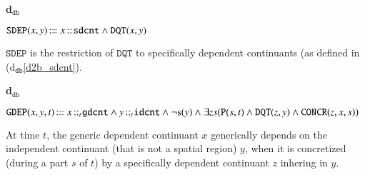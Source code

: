 \documentclass[ao]{iosart2x}
\newcommand{\bfoAxLabel}{\textrm{a$_\texttt{b}$}}
\newcommand{\dolceDefLabel}{\textrm{d$_\texttt{d}$}}
\newcommand{\dbDefLabel}{\textrm{d$_\texttt{db}$}}
\newcounter{cntdbdf}
\newcommand{\dbdf}[1]{\refstepcounter{cntdbdf}\begin{small}{\bf \dbDefLabel\thecntdbdf\label{#1}}\end{small}}
\newcommand{\refdolcedf}[1]{({\dolceDefLabel}\ref{#1})}
\newcommand{\refbfoax}[1]{({\bfoAxLabel}\ref{#1})}
\newcommand{\refdbdf}[1]{({\dbDefLabel}\ref{#1})}
\newcommand{\pr}[1]{\mathtt{#1}}
\newcommand{\cn}[1]{\mathtt{#1}}
\newcommand\textequal{%
 \rule[.08ex]{5pt}{0.35pt}\llap{\rule[.78ex]{5pt}{0.35pt}}}
\newcommand{\sdef}{{\hspace{1.5pt}:\hspace{-2.5pt}\textequal\hspace{3pt}}}
\newcommand{\dolce}{{\textsc{dolce}}}
\newcommand{\bfo}{{\textsc{bfo}}}
\newcommand {\Sdcat} {\textsc{s}}
\newcommand {\Pd} {\ensuremath{\pr{P}}}
\newcommand {\DQTd} {\ensuremath{\pr{DQT}}}
\newcommand {\SDd} {\ensuremath{\pr{SD}}}
\newcommand {\SLCd} {\ensuremath{\pr{SLC}}}
\newcommand{\idcntbcat}{\cn{idcnt}}
\newcommand{\gdcntbcat}{\cn{gdcnt}}
\newcommand{\sdcntbcat}{\cn{sdcnt}}
\newcommand{\bfocoverlap}{\pr{cO}}
\newcommand{\bfoiof}[1]{{\,::_{#1\:\!}}}
\newcommand{\bfosdep}{\pr{SDEP}}
\newcommand{\bfogdep}{\pr{GDEP}}
\newcommand{\bfolocated}{\pr{LOC}}
\newcommand{\bfoconcr}{\pr{CONCR}}
\begin{document}
%

\item[\dbdf{d2b_sdep}] $\bfosdep(x,y) \sdef x \bfoiof{} \sdcntbcat \land \DQTd(x,y)$

\vspace{1pt}
$\bfosdep$ is the restriction of $\DQTd$ to specifically dependent continuants (as defined in \refdbdf{d2b_sdcnt}.

%
%
%
%

\item[\dbdf{d2b_gdep}] $\bfogdep(x,y,t) \sdef x \bfoiof{t} \gdcntbcat \land y \bfoiof{t} \idcntbcat \land \neg\Sdcat(y) \land \exists zs(\Pd(s,t) \land \DQTd(z,y) \land \bfoconcr(z,x,s))$

\vspace{1pt}
At time $t$, the generic dependent continuant $x$ generically depends on the independent continuant (that is not a spatial region) $y$, when it is concretized (during a part $s$ of $t$) by a specifically dependent continuant $z$ inhering in $y$. 
\end{document}
